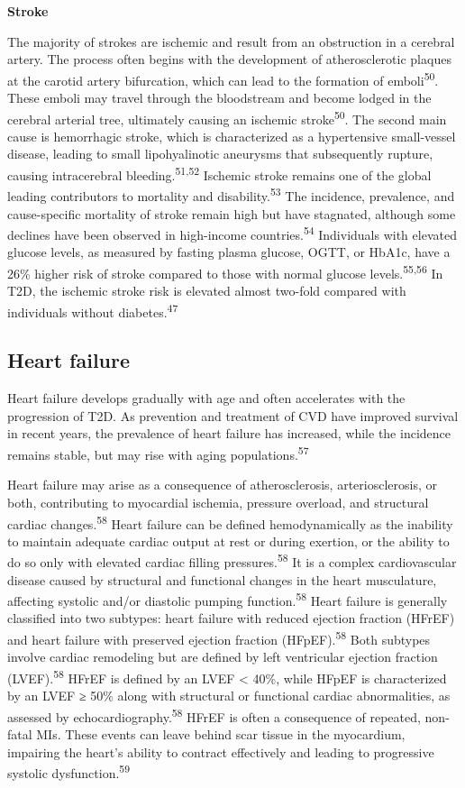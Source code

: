 \documentclass[
  letterpaper,
  headsepline=true,
  open=any]{scrbook}
\begin{document}
\textbf{Stroke}

The majority of strokes are ischemic and result from an obstruction in a
cerebral artery. The process often begins with the development of
atherosclerotic plaques at the carotid artery bifurcation, which can
lead to the formation of emboli\textsuperscript{50}. These emboli may
travel through the bloodstream and become lodged in the cerebral
arterial tree, ultimately causing an ischemic
stroke\textsuperscript{50}. The second main cause is hemorrhagic stroke,
which is characterized as a hypertensive small-vessel disease, leading
to small lipohyalinotic aneurysms that subsequently rupture, causing
intracerebral bleeding.\textsuperscript{51,52} Ischemic stroke remains
one of the global leading contributors to mortality and
disability.\textsuperscript{53} The incidence, prevalence, and
cause-specific mortality of stroke remain high but have stagnated,
although some declines have been observed in high-income
countries.\textsuperscript{54} Individuals with elevated glucose levels,
as measured by fasting plasma glucose, OGTT, or HbA1c, have a 26\%
higher risk of stroke compared to those with normal glucose
levels.\textsuperscript{55,56} In T2D, the ischemic stroke risk is
elevated almost two-fold compared with individuals without
diabetes.\textsuperscript{47}

\hypertarget{heart-failure}{%
\subsection{Heart failure}\label{heart-failure}}

Heart failure develops gradually with age and often accelerates with the
progression of T2D. As prevention and treatment of CVD have improved
survival in recent years, the prevalence of heart failure has increased,
while the incidence remains stable, but may rise with aging
populations.\textsuperscript{57}

Heart failure may arise as a consequence of atherosclerosis,
arteriosclerosis, or both, contributing to myocardial ischemia, pressure
overload, and structural cardiac changes.\textsuperscript{58} Heart
failure can be defined hemodynamically as the inability to maintain
adequate cardiac output at rest or during exertion, or the ability to do
so only with elevated cardiac filling pressures.\textsuperscript{58} It
is a complex cardiovascular disease caused by structural and functional
changes in the heart musculature, affecting systolic and/or diastolic
pumping function.\textsuperscript{58} Heart failure is generally
classified into two subtypes: heart failure with reduced ejection
fraction (HFrEF) and heart failure with preserved ejection fraction
(HFpEF).\textsuperscript{58} Both subtypes involve cardiac remodeling
but are defined by left ventricular ejection fraction
(LVEF).\textsuperscript{58} HFrEF is defined by an LVEF \textless{}
40\%, while HFpEF is characterized by an LVEF ≥ 50\% along with
structural or functional cardiac abnormalities, as assessed by
echocardiography.\textsuperscript{58} HFrEF is often a consequence of
repeated, non-fatal MIs. These events can leave behind scar tissue in
the myocardium, impairing the heart's ability to contract effectively
and leading to progressive systolic dysfunction.\textsuperscript{59}
\end{document}
